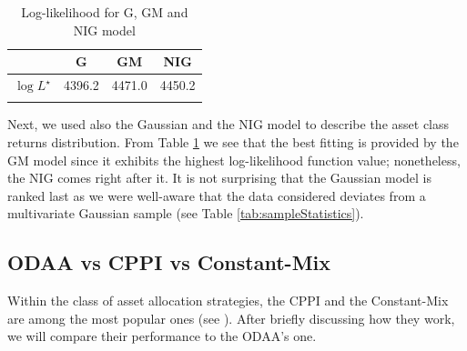 \begin{table}[]
	\centering
	\begin{tabular}{@{}*{4}{c}@{}}
		\toprule
		& G & GM & NIG \\
		\midrule	
		$\log L^{\star}$ & 4396.2& 4471.0  & 4450.2\\
		\addlinespace[0.5em]	
		\bottomrule
	\end{tabular}
	\caption{Log-likelihood for G, GM and NIG model}
	\label{tab:LogL_models}
\end{table}

Next, we used also the Gaussian and the \gls{NIG} model to describe the asset class returns distribution. From Table \ref{tab:LogL_models} we see that the best fitting is provided by the GM model since it exhibits the highest log-likelihood function value; nonetheless, the \gls{NIG} comes right after it. It is not surprising that the Gaussian model is ranked last as we were well-aware that the data considered deviates from a multivariate Gaussian sample (see Table \ref{tab:sampleStatistics}).


\subsection{ODAA vs CPPI vs Constant-Mix}
Within the class of asset allocation strategies, the \gls{CPPI} and the Constant-Mix are among the most popular ones (see \cite{Perold1988}). After briefly discussing how they work, we will compare their performance to the ODAA's one.
